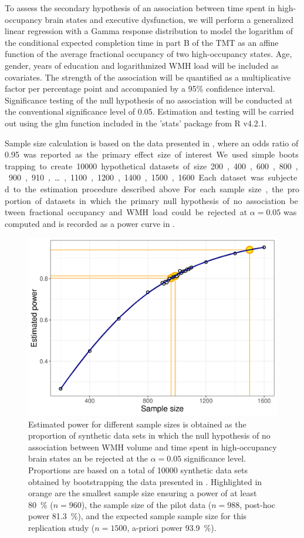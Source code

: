 To  assess the secondary hypothesis of an association between time spent in high-occupancy brain states and executive dysfunction, we will perform a generalized linear regression with a Gamma response distribution to model the logarithm of the conditional expected completion time in part B of the TMT as an affine function of the average fractional occupancy of two high-occupancy states.
Age, gender, years of education and logarithmized WMH load will be included as covariates.
The strength of the association will be quantified as a multiplicative factor per percentage point and accompanied by a 95\% confidence interval.
Significance testing of the null hypothesis of no association will be conducted at the conventional significance level of 0.05.
Estimation and testing will be carried out using the glm function included in the 'stats' package from R v4.2.1.

Sample size calculation is based on the data presented in \citep{Schlemm2022-he}, where an odds ratio of \qty{0.95} was reported as the primary effect size of interest.
We used simple bootstrapping to create \num{10000} hypothetical datasets of size \num{200}, \num{400}, \num{600}, \num{800}, \num{900}, \num{910}, \ldots, \num{1100}, \num{1200}, \num{1400}, \num{1500}, \num{1600}.
Each dataset was subjected to the estimation procedure described above.
For each sample size, the proportion of datasets in which the primary null hypothesis of no association between fractional occupancy and WMH load could be rejected at $\alpha=0.05$ was computed and is recorded as a power curve in .

\begin{figure}
    \includegraphics[width=.5\linewidth]{./../analysis/code/R/pipeline_files/figure-html/power-1.png}
    \caption{Estimated power for different sample sizes is obtained as the proportion of synthetic data sets in which the null hypothesis of no association between WMH volume and time spent in high-occupancy brain states an be rejected at the $\alpha=0.05$ significance level. Proportions are based on a total of \num{10000} synthetic data sets obtained by bootstrapping the data presented in \citep{Schlemm2022-he}. Highlighted in orange are the smallest sample size ensuring a power of at least \qty{80}{\percent} ($n=960$), the sample size of the pilot data ($n=988$, post-hoc power \qty{81.3}{\percent}), and the expected sample sample size for this replication study ($n=1500$, a-priori power \qty{93.9}{\percent}).}
    \label{fig:power}
\end{figure}

